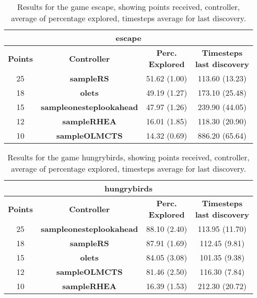\begin{table*}[!t]
\begin{center}
\begin{tabular}{|c|c|c|c|}
\multicolumn{4}{c}{\textbf{escape}}\\
\hline
\textbf{Points} & \textbf{Controller} & \textbf{Perc. Explored} &  \textbf{Timesteps last discovery}\\
\hline
25 & \textbf{sampleRS} & 51.62 (1.00) & 113.60 (13.23)
 \\
\hline
18 & \textbf{olets} & 49.19 (1.27) & 173.10 (25.48)
 \\
\hline
15 & \textbf{sampleonesteplookahead} & 47.97 (1.26) & 239.90 (44.05)
 \\
\hline
12 & \textbf{sampleRHEA} & 16.01 (1.85) & 118.30 (20.90)
 \\
\hline
10 & \textbf{sampleOLMCTS} & 14.32 (0.69) & 886.20 (65.64)
 \\
\hline
\end{tabular}
\caption{Results for the game escape, showing points received, controller, average of percentage explored, timesteps average for last discovery.}
\label{tab:weights}
\end{center}
\end{table*}
\begin{table*}[!t]
\begin{center}
\begin{tabular}{|c|c|c|c|}
\multicolumn{4}{c}{\textbf{hungrybirds}}\\
\hline
\textbf{Points} & \textbf{Controller} & \textbf{Perc. Explored} &  \textbf{Timesteps last discovery}\\
\hline
25 & \textbf{sampleonesteplookahead} & 88.10 (2.40) & 113.95 (11.70)
 \\
\hline
18 & \textbf{sampleRS} & 87.91 (1.69) & 112.45 (9.81)
 \\
\hline
15 & \textbf{olets} & 84.05 (3.08) & 101.35 (9.38)
 \\
\hline
12 & \textbf{sampleOLMCTS} & 81.46 (2.50) & 116.30 (7.84)
 \\
\hline
10 & \textbf{sampleRHEA} & 16.39 (1.53) & 212.30 (20.72)
 \\
\hline
\end{tabular}
\caption{Results for the game hungrybirds, showing points received, controller, average of percentage explored, timesteps average for last discovery.}
\label{tab:weights}
\end{center}
\end{table*}
